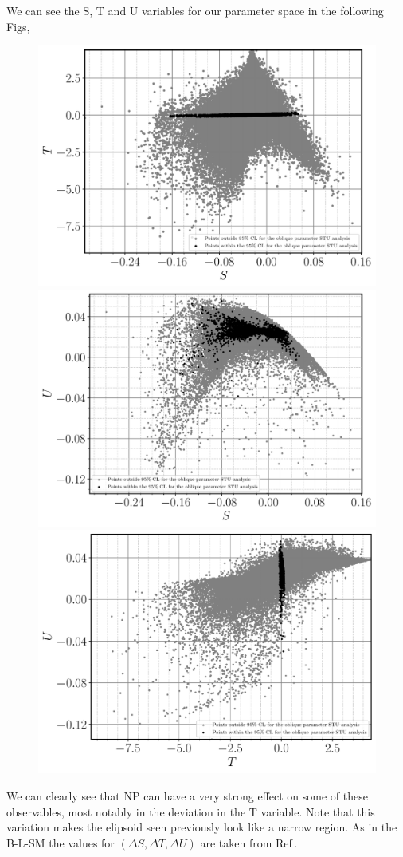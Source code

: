 We can see the S, T and U variables for our parameter space in the following Figs, 
%
\begin{figure}[H]
	\centering
	\includegraphics[width=.49\textwidth]{Images/3HDM/EW/EW_S_T_black.pdf}	\includegraphics[width=.49\textwidth]{Images/3HDM/EW/EW_S_U_black.pdf}
	\includegraphics[width=.49\textwidth]{Images/3HDM/EW/EW_T_U_black.pdf}
	\caption{}
	\label{Fig:3HDM_STU}
\end{figure}	
%
We can clearly see that NP can have a very strong effect on some of these observables, most notably in the deviation in the T variable.
%
Note that this variation makes the elipsoid seen previously look like a narrow region. 
%
As in the B-L-SM the values for $(\Delta S , \Delta T , \Delta U )$ are taken from  Ref\,\cite{Baak_2012}.


